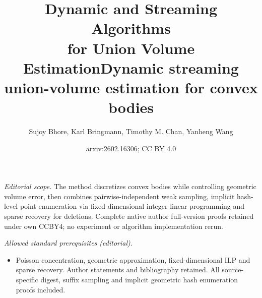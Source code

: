 \documentclass[11pt]{article}
\title{Dynamic and Streaming Algorithms\\for Union Volume Estimation}
\title{Dynamic streaming union-volume estimation for convex bodies}
\author{Sujoy Bhore, Karl Bringmann, Timothy M. Chan, Yanheng Wang}
\date{arxiv:2602.16306; CC BY 4.0}
\begin{document}
\maketitle
\noindent\textit{Editorial scope.} The method discretizes convex bodies while controlling geometric volume error, then combines pairwise-independent weak sampling, implicit hash-level point enumeration via fixed-dimensional integer linear programming and sparse recovery for deletions. Complete native author full-version proofs retained under own CCBY4; no experiment or algorithm implementation rerun.\par\medskip
\noindent\textit{Allowed standard prerequisites (editorial).}\begin{itemize}
\item Poisson concentration, geometric approximation, fixed-dimensional ILP and sparse recovery. Author statements and bibliography retained. All source-specific digest, suffix sampling and implicit geometric hash enumeration proofs included.
\end{itemize}\medskip
\end{document}
